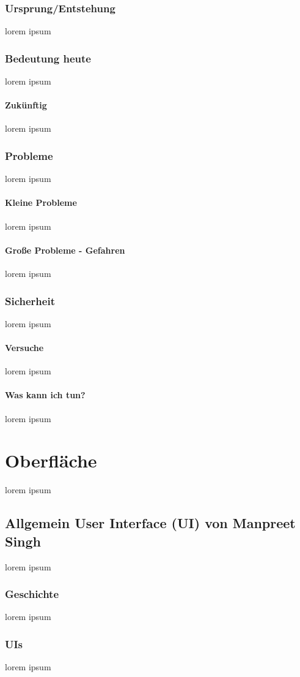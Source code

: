 \documentclass[11pt,a4paper]{report}
\begin{document}
\subsection{Ursprung/Entstehung}
lorem ipsum
\subsection{Bedeutung heute}
lorem ipsum
\subsubsection{Zukünftig}
lorem ipsum
\subsection{Probleme}
lorem ipsum
\subsubsection{Kleine Probleme}
lorem ipsum
\subsubsection{Große Probleme - Gefahren}
lorem ipsum
\subsection{Sicherheit}
lorem ipsum
\subsubsection{Versuche}
lorem ipsum
\subsubsection{Was kann ich tun?}
lorem ipsum

\chapter{Oberfläche}
lorem ipsum
\section{Allgemein User Interface (UI) von Manpreet Singh}
lorem ipsum
\subsection{Geschichte}
lorem ipsum
\subsection{UIs}
lorem ipsum 
\end{document}
